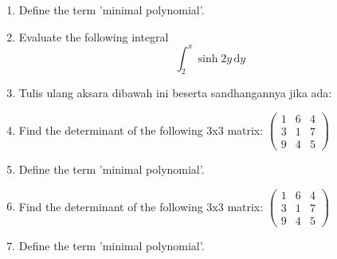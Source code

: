 \documentclass{article}
\begin{document}
\begin{multicols}{2}
    \begin{enumerate}%

\item Define the term 'minimal polynomial'.

\item Evaluate the following integral 
\begin{equation*}
\int_{2}^{x} \sinh{2y}\, \mathrm{d}y
\end{equation*}
    


\item Tulis ulang aksara dibawah ini beserta sandhangannya jika ada:  \\
{\java {} \quad {}  \quad {} \par}
\item Find the determinant of the following 3x3 matrix:
\begin{math}
\begin{pmatrix}
1 & 6 & 4 \\
3 & 1 & 7 \\
9 & 4 & 5
\end{pmatrix}
\end{math}
\item Define the term 'minimal polynomial'.

\item Find the determinant of the following 3x3 matrix:
\begin{math}
\begin{pmatrix}
1 & 6 & 4 \\
3 & 1 & 7 \\
9 & 4 & 5
\end{pmatrix}
\end{math}

\item Define the term 'minimal polynomial'.
\end{enumerate}%
\end{multicols}
\end{document}
